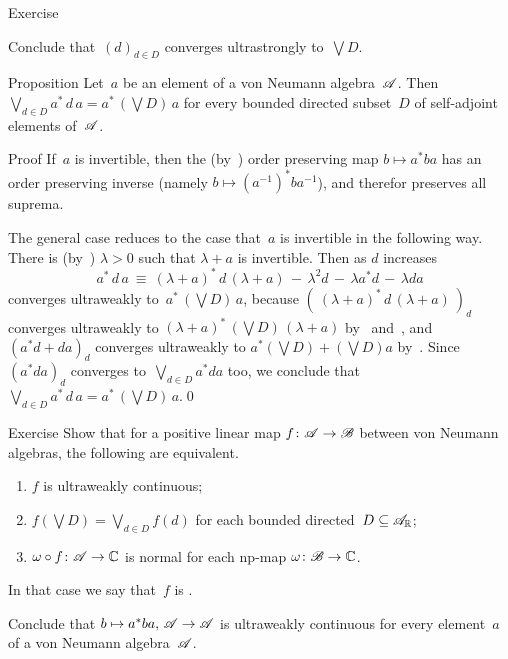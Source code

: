 \documentclass[a]{subfiles}
\begin{document}
\begin{parsec}
\begin{point}{Exercise}
\begin{point}
Conclude that~$(d)_{d\in D}$ converges ultrastrongly to~$\bigvee D$.
\end{point}
\end{point}
%
%
\begin{point}[ad-normal]{Proposition}%
Let~$a$ be an element of a von Neumann algebra~$\mathscr{A}$.
Then~$\bigvee_{d\in D} a^*\,d\,a = a^*\,(\bigvee D)\, a$
for every bounded directed subset~$D$ of self-adjoint
elements of~$\mathscr{A}$.
\begin{point}[ad-normal-1]{Proof}%
If~$a$ is invertible,
then the (by~) order preserving map $b\mapsto a^*ba$
has an order preserving inverse (namely $b\mapsto (a^{-1})^* b a^{-1}$),
and therefor preserves all suprema.
\begin{point}%
The general case reduces to the case that~$a$ 
is invertible
in the following way.
There is (by~)
 $\lambda>0$ such that $\lambda+a$ is invertible.
Then as $d$ increases 
\begin{equation*}
a^*\,d\,a \ \equiv\  (\lambda+a)^*\,d\,(\lambda+a) \,-\,
 \lambda^2d \,-\, \lambda a^*d \,-\, \lambda da
\end{equation*}
converges ultraweakly
to~$a^* \,(\bigvee D)\,a$,
because $(\ (\lambda+a)^*\,d\,(\lambda+a)\ )_d$
converges ultraweakly to $(\lambda+a)^*\,(\bigvee D)\,(\lambda+a)$
by~ and~,
and $(a^*d+da)_d$ converges ultraweakly to $a^*(\bigvee D)+(\bigvee D)a$
by~.
Since~$(a^*da)_d$ converges to~$\bigvee_{d\in D} a^*d a$ too,
we conclude that~$\bigvee_{d\in D} a^* \,d\, a = a^*\,(\bigvee D)\,a$.\qed
\end{point}
\end{point}
\end{point}
\begin{point}[p-uwcont]{Exercise}%
Show that for a positive linear map $f\colon \mathscr{A}\to\mathscr{B}$
between von Neumann algebras,
the following are equivalent.
\begin{enumerate}
\item
$f$ is ultraweakly continuous;
\item
$f(\bigvee D)=\bigvee_{d\in D}f(d)$ for each bounded 
directed~$D\subseteq\mathscr{A}_{\mathbb{R}}$;
\item 
$\omega\circ f\colon \mathscr{A}\to\mathbb{C}$ is normal 
for each np-map $\omega\colon \mathscr{B}\to\mathbb{C}$.
\end{enumerate}
In that case we say that~$f$ is .

Conclude that $b\mapsto a^*ba,\,\mathscr{A}\to\mathscr{A}$
is ultraweakly
continuous for every element~$a$ of a von Neumann 
algebra~$\mathscr{A}$.


\end{point}
\end{parsec}
\end{document}
